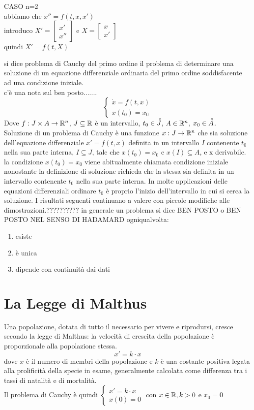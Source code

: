 \begin{example}
	CASO n=2\\
	abbiamo che $ x''=f(t,x, x')$\\
	introduco $ X'=\begin{bmatrix} x'\\ x''\end{bmatrix}$ e $X=\begin{bmatrix}x\\ x'\end{bmatrix}$\\
	quindi $ X'=f(t,X)$
\end{example}
si dice problema di Cauchy del primo ordine il problema di determinare una soluzione di un equazione differenziale ordinaria del primo ordine soddisfacente ad una condizione iniziale.\\
c'è una nota sul ben posto.......\\
$$\left\{\begin{matrix}
\dot{x}=f(t,x)\\x(t_0)=x_0
\end{matrix}\right.$$
Dove $f:J\times A\to \mathbb{R}^n$, $J\subseteq \mathbb{R}$ è un intervallo, $t_0\in\accentset{\circ}{J}$, $A\in \mathbb{R}^n$, $x_0\in\accentset{\circ}{A}$.\\
Soluzione di un problema di Cauchy è una funzione $x:J\to \mathbb{R}^n$ che sia soluzione dell'equazione differenziale $ x'=f(t,x)$ definita in un intervallo $I$ contenente $t_0$ nella sua parte interna, $I\subseteq J$, tale che $x(t_0)=x_0$ e $x(I)\subseteq A$, e x derivabile.
\observation
la condizione $x(t_0)=x_0$ viene abitualmente chiamata condizione iniziale nonostante la definizione di soluzione richieda che la stessa sia definita in un intervallo contenente $t_0$ nella sua parte interna. In molte applicazioni delle equazioni differenziali ordinare $t_0$ è proprio l'inizio dell'intervallo in cui si cerca la soluzione. I risultati seguenti continuano a valere con piccole modifiche alle dimostrazioni.??????????
\observation
in generale un problema si dice BEN POSTO o BEN POSTO NEL SENSO DI HADAMARD ogniqualvolta:
\begin{enumerate}
	\item esiste
	\item è unica
	\item dipende con continuità dai dati
\end{enumerate} 
\section{La Legge di Malthus}
Una popolazione, dotata di tutto il necessario per vivere e riprodursi, cresce secondo la legge di Malthus: la velocità di crescita della popolazione è proporzionale alla popolazione stessa.\\
$$ x'=k\cdot x$$
dove $x$ è il numero di membri della popolazione e $k$ è una costante positiva legata alla prolificità della specie in esame, generalmente calcolata come differenza tra i tassi di natalità e di mortalità.\\
Il problema di Cauchy è quindi $\left\{\begin{matrix} x'=k\cdot x\\x(0)=0\end{matrix}\right.$ con $x\in \mathbb{R}, k>0 $ e $ x_0=0$

